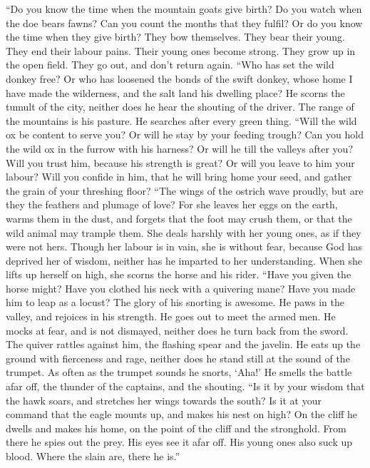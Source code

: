  ``Do you know the time when the mountain goats give
birth? Do you watch when the doe bears fawns?  Can you
count the months that they fulfil? Or do you know the time when they
give birth?  They bow themselves. They bear their young.
They end their labour pains.  Their young ones become
strong. They grow up in the open field. They go out, and don't return
again.  ``Who has set the wild donkey free? Or who has
loosened the bonds of the swift donkey,  whose home I have
made the wilderness, and the salt land his dwelling place?
 He scorns the tumult of the city, neither does he hear
the shouting of the driver.  The range of the mountains is
his pasture. He searches after every green thing.  ``Will
the wild ox be content to serve you? Or will he stay by your feeding
trough?  Can you hold the wild ox in the furrow with his
harness? Or will he till the valleys after you?  Will you
trust him, because his strength is great? Or will you leave to him your
labour?  Will you confide in him, that he will bring home
your seed, and gather the grain of your threshing floor? 
``The wings of the ostrich wave proudly, but are they the feathers and
plumage of love?  For she leaves her eggs on the earth,
warms them in the dust,  and forgets that the foot may
crush them, or that the wild animal may trample them. 
She deals harshly with her young ones, as if they were not hers. Though
her labour is in vain, she is without fear,  because God
has deprived her of wisdom, neither has he imparted to her
understanding.  When she lifts up herself on high, she
scorns the horse and his rider.  ``Have you given the
horse might? Have you clothed his neck with a quivering mane?
 Have you made him to leap as a locust? The glory of his
snorting is awesome.  He paws in the valley, and rejoices
in his strength. He goes out to meet the armed men.  He
mocks at fear, and is not dismayed, neither does he turn back from the
sword.  The quiver rattles against him, the flashing
spear and the javelin.  He eats up the ground with
fierceness and rage, neither does he stand still at the sound of the
trumpet.  As often as the trumpet sounds he snorts,
`Aha!' He smells the battle afar off, the thunder of the captains, and
the shouting.  ``Is it by your wisdom that the hawk
soars, and stretches her wings towards the south?  Is it
at your command that the eagle mounts up, and makes his nest on high?
 On the cliff he dwells and makes his home, on the point
of the cliff and the stronghold.  From there he spies out
the prey. His eyes see it afar off.  His young ones also
suck up blood. Where the slain are, there he is.''

